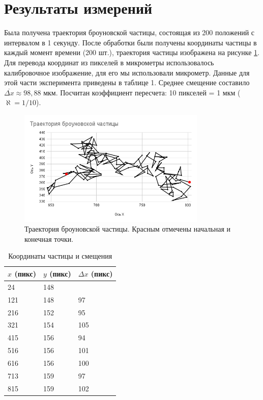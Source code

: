 \documentclass[a4paper,14pt]{article}
\begin{document}
\section{Результаты измерений}
Была получена траектория броуновской частицы, состоящая из 200 положений с интервалом в 1 секунду. После обработки были получены координаты частицы в каждый момент времени (200 шт.), траектория частицы изображена на рисунке \ref{fig:trajectory}. Для перевода координат из пикселей в микрометры использовалось калибровочное изображение, для его мы использовали микрометр. Данные для этой части эксперимента приведены в таблице 1. Среднее смещение составило $\overline{\Delta x} \approx 98,88$ мкм. Посчитан коэффициент пересчета: 10 пикселей = 1 мкм ($\aleph = 1/10$).

\begin{figure}[h]
    \centering
    \includegraphics[width=0.8\textwidth]{trajectory.png}
    \caption{Траектория броуновской частицы. Красным отмечены начальная и конечная точки.}
    \label{fig:trajectory}
\end{figure}


\clearpage
\begin{table}[h]
    \centering
    \caption{Координаты частицы и смещения}
    \begin{tabular}{|l|l|l|}
    \hline
        $x$ (пикс) & $y$ (пикс) & $\Delta x$ (пикс) \\ \hline
        24  & 148 &  \\ \hline
        121 & 148 & 97 \\ \hline
        216 & 152 & 95 \\ \hline
        321 & 154 & 105 \\ \hline
        415 & 156 & 94 \\ \hline
        516 & 156 & 101 \\ \hline
        616 & 156 & 100 \\ \hline
        713 & 159 & 97 \\ \hline
        815 & 159 & 102 \\ \hline
    \end{tabular}
    \label{tab:coordinates}
\end{table}
\end{document}
